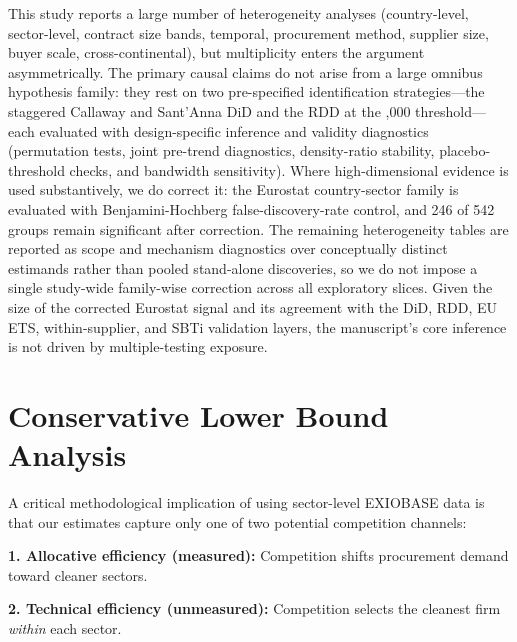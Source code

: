 \documentclass[11pt]{article}
\begin{document}
This study reports a large number of heterogeneity analyses (country-level, sector-level, contract size bands, temporal, procurement method, supplier size, buyer scale, cross-continental), but multiplicity enters the argument asymmetrically. The primary causal claims do not arise from a large omnibus hypothesis family: they rest on two pre-specified identification strategies---the staggered Callaway and Sant'Anna DiD and the RDD at the ,000 threshold---each evaluated with design-specific inference and validity diagnostics (permutation tests, joint pre-trend diagnostics, density-ratio stability, placebo-threshold checks, and bandwidth sensitivity). Where high-dimensional evidence is used substantively, we do correct it: the Eurostat country-sector family is evaluated with Benjamini-Hochberg false-discovery-rate control, and 246 of 542 groups remain significant after correction. The remaining heterogeneity tables are reported as scope and mechanism diagnostics over conceptually distinct estimands rather than pooled stand-alone discoveries, so we do not impose a single study-wide family-wise correction across all exploratory slices. Given the size of the corrected Eurostat signal and its agreement with the DiD, RDD, EU ETS, within-supplier, and SBTi validation layers, the manuscript's core inference is not driven by multiple-testing exposure.

\section{Conservative Lower Bound Analysis}

A critical methodological implication of using sector-level EXIOBASE data is that our estimates capture only one of two potential competition channels:

\textbf{1. Allocative efficiency (measured):} Competition shifts procurement demand toward cleaner sectors.

\textbf{2. Technical efficiency (unmeasured):} Competition selects the cleanest firm \textit{within} each sector.
\end{document}
